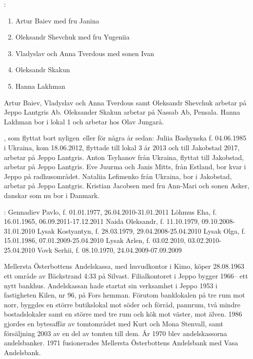 :
\begin{enumerate}
  \item Artur Baiev med fru Janina
  \item Oleksandr Shevchuk med fru Yugeniia
  \item Vladyslav och Anna Tverdous med sonen Ivan
  \item Oleksandr Skakun
  \item Hanna Lakhman
\end{enumerate}
Artur Baiev, Vladyslav och Anna Tverdous samt Oleksandr Shevchuk arbetar på Jeppo Lantgris Ab. Oleksander Skakun arbetar på Nassab Ab, Pensala. Hanna Lakhman bor i lokal 1 och arbetar hos Olav Jungarå.


, som flyttat bort nyligen eller för några år sedan:
Juliia Bashynska f. 04.06.1985 i Ukraina, kom 18.06.2012, flyttade till lokal 3 år 2013 och till Jakobstad 2017, arbetar på Jeppo Lantgris.
Anton Tsyhanov från Ukraina, flyttat till Jakobstad, arbetar på Jeppo Lantgris.
Eve Juurma och Janis Mitts, från  Estland, bor kvar i Jeppo på radhusområdet.
Nataliia Lefimenko från Ukraina, bor i Jakobstad, arbetar på Jeppo Lantgris.
Kristian Jacobsen med fru Ann-Mari och sonen Asker, danskar som nu bor i Danmark.


:
Gennadiev Pavlo,  f. 01.01.1977,    26.04.2010-31.01.2011
Löhmus Eha,       f. 16.01.1965,    06.09.2011-17.12.2011
Naida Oleksandr,  f. 11.10.1979,    09.10.2008-31.01.2010
Lysak Kostyantyn, f. 28.03.1979,    29.04.2008-25.04.2010
Lysak Olga,       f. 15.01.1986,    07.01.2009-25.04.2010
Lysak Arlen,      f. 03.02.2010,    03.02.2010-25.04.2010
Vovk Serhii,      f. 08.10.1970,    24.04.2009-07.09.2009


Mellersta Österbottens Andelskassa, med huvudkontor i Kimo, köper 28.08.1963 ett område av Bäckstrand 4:33 på Silvast. Filialkontoret i Jeppo bygger 1966-- ett nytt bankhus. Andelskassan hade startat sin verksamhet i Jeppo 1953 i fastigheten Kilen, nr 96, på Fors hemman.	Förutom banklokalen på tre rum mot norr, byggdes en större butikslokal mot söder och förråd, pannrum, två mindre bostadslokaler samt en större med tre rum och kök mot väster, mot älven. 1986 gjordes en bytesaffär av tomtområdet med Kurt och Mona Stenvall, samt	försäljning 2003 av en del av tomten till dem. År 1970 blev andelskassorna andelsbanker. 1971 fusionerades Mellersta Österbottens Andelsbank med Vasa Andelsbank.

